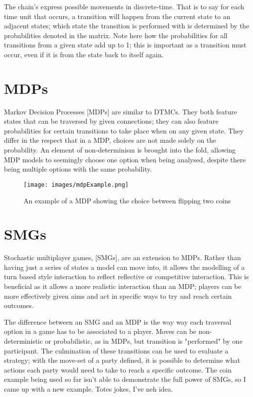 \documentclass{l4proj}
\begin{document}
The chain's express possible movements in discrete-time. That is to say for each time unit that occurs, a transition will happen from the current state to an adjacent states; which state the transition is performed with is determined by the probabilities denoted in the matrix. Note here how the probabilities for all transitions from a given state add up to 1; this is important as a transition must occur, even if it is from the state back to itself again. 


\section{MDPs}


Markov Decision Processes [MDPs] are similar to DTMCs. They both feature states that can be traversed by given connections; they can also feature probabilities for certain transitions to take place when on any given state. They differ in the respect that in a MDP, choices are not made solely on the probability. An element of non-determinism is brought into the fold, allowing MDP models to seemingly choose one option when being analysed, despite there being multiple options with the same probability. 

\begin{figure}[ht!]
\centering
\texttt{[image: images/mdpExample.png]}
\caption{An example of a MDP showing the choice between flipping two coins}
\label{mdp}
\end{figure}



\section{SMGs}


Stochastic multiplayer games, [SMGs], are an extension to MDPs. Rather than having just a series of states a model can move into, it allows the modelling of a turn based style interaction to reflect reflective or competitive interaction. This is beneficial as it allows a more realistic interaction than an MDP; players can be more effectively given aims and act in specific ways to try and reach certain outcomes. 

The difference between an SMG and an MDP is the way way each traversal option in a game has to be associated to a player. Moves can be non-deterministic or probabilistic, as in MDPs, but transition is "performed" by one participant. The culmination of these transitions can be used to evaluate a strategy; with the move-set of a party defined, it is possible to determine what actions each party would need to take to reach a specific outcome. The coin example being used so far isn't able to demonstrate the full power of SMGs, so I came up with a new example. Totes jokes, I've neh idea.
\end{document}
